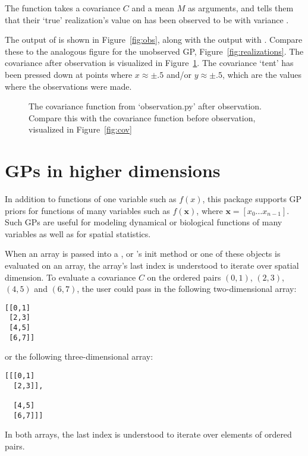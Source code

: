 \documentclass[article]{jss}
\begin{document}
The function  takes a covariance $C$ and a mean $M$ as arguments, and tells them that their `true' realization's value on  has been observed to be  with variance . 

The output of   is shown in Figure~\ref{fig:obs}, along with the output with . Compare these to the analogous figure for the unobserved GP, Figure~\ref{fig:realizations}. The covariance after observation is visualized in Figure~\ref{fig:obscov}. The covariance `tent' has been pressed down at points where $x\approx \pm .5$ and/or $y\approx\pm .5$, which are the values where the observations were made.

\begin{figure}
    \centering
    \caption{The covariance function from {\sffamily `observation.py'} after observation. Compare this with the covariance function before observation, visualized in Figure~\ref{fig:cov} }
    \label{fig:obscov}
\end{figure}

\section{GPs in higher dimensions}\label{sec:highdim}

In addition to functions of one variable such as $f(x)$, this package supports GP priors for functions of many variables such as $f(\mathbf{x})$, where $\mathbf{x}=[x_0\ldots x_{n-1}]$. Such GPs are useful for modeling dynamical or biological functions of many variables as well as for spatial statistics.

When an array is passed into a ,  or 's init method or one of these objects is evaluated on an array, the array's last index is understood to iterate over spatial dimension. To evaluate a covariance $C$ on the ordered pairs $(0,1)$, $(2,3)$, $(4,5)$ and $(6,7)$, the user could pass in the following two-dimensional  array:
\begin{verbatim}
[[0,1]
 [2,3]
 [4,5]
 [6,7]]
\end{verbatim}
or the following three-dimensional array:
\begin{verbatim}
[[[0,1]
  [2,3]],

  [4,5]
  [6,7]]]
\end{verbatim}
In both arrays, the last index is understood to iterate over elements of ordered pairs.
\end{document}
